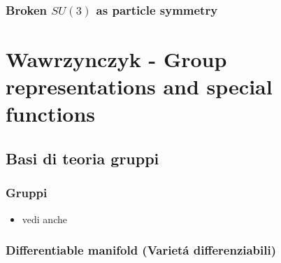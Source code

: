 \documentclass[oneside,12pt]{memoir}
\begin{document}
\section{Broken \texorpdfstring{$SU(3)$}{SU3} as particle symmetry}


\printbibliography[heading=subbibintoc]

\part{Wawrzynczyk - Group representations and special functions}

\chapter{Basi di teoria gruppi}
\PartialToc

\section{Gruppi}

\begin{itemize}
\item vedi anche 
\end{itemize}

\section{Differentiable manifold (Variet\'a differenziabili)}
\end{document}
